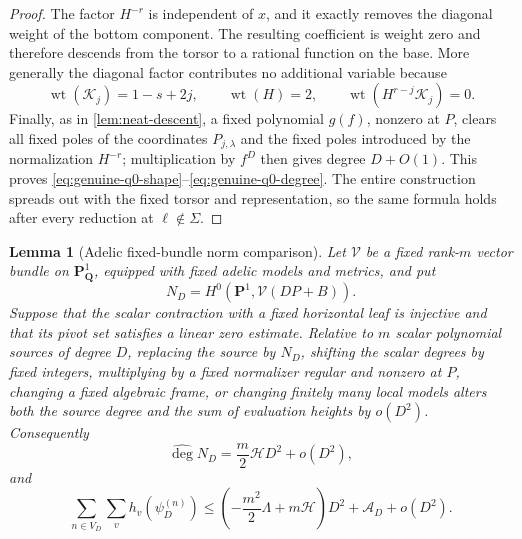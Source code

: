 \documentclass[11pt]{article}
\newtheorem{lemma}[lemma]{Lemma}
\theoremstyle{definition}
\theoremstyle{remark}
\newcommand{\Q}{\mathbf Q}
\newcommand{\calK}{\mathcal K}
\newcommand{\calV}{\mathcal V}
\newcommand{\widehatdeg}{\widehat{\deg}}
\newcommand{\Energy}{\mathscr H}
\newcommand{\LambdaAH}{\Lambda}
\begin{document}
\begin{proof}
The factor $H^{-r}$ is independent of $x$, and it exactly removes the
diagonal weight of the bottom component.  The resulting coefficient is
weight zero and therefore descends from the torsor to a rational function on
the base.  More generally the diagonal factor contributes no additional
variable because
\[
 \operatorname{wt}(\calK_j)=1-s+2j,
 \qquad \operatorname{wt}(H)=2,
 \qquad \operatorname{wt}(H^{r-j}\calK_j)=0.
\]
Finally, as in \cref{lem:neat-descent}, a fixed polynomial $g(f)$, nonzero at
$P$, clears all fixed poles of the coordinates $P_{j,\lambda}$ and the
fixed poles introduced by the normalization $H^{-r}$; multiplication by
$f^D$ then gives degree $D+O(1)$.  This proves
\eqref{eq:genuine-q0-shape}--\eqref{eq:genuine-q0-degree}.  The entire
construction spreads out with the fixed torsor and representation, so the
same formula holds after every reduction at $\ell\notin\Sigma$.
\end{proof}

\begin{lemma}[Adelic fixed-bundle norm comparison]
\label{lem:fixed-bundle}
Let $\calV$ be a fixed rank-$m$ vector bundle on $\mathbf P^1_\Q$, equipped
with fixed adelic models and metrics, and put
\[
 N_D=H^0\left(\mathbf P^1,\calV(DP+B)\right).
\]
Suppose that the scalar contraction with a fixed horizontal leaf is
injective and that its pivot set satisfies a linear zero estimate.  Relative
to $m$ scalar polynomial sources of degree $D$, replacing the source by
$N_D$, shifting the scalar degrees by fixed integers, multiplying by a fixed
normalizer regular and nonzero at $P$, changing a fixed algebraic frame, or
changing finitely many local models alters both the source degree and the
sum of evaluation heights by $o(D^2)$.  Consequently
\begin{equation}\label{eq:fixed-bundle-degree}
 \widehatdeg N_D=\frac m2\Energy D^2+o(D^2),
\end{equation}
and
\begin{equation}\label{eq:fixed-bundle-heights}
 \sum_{n\in V_D}\sum_vh_v(\psi_D^{(n)})
 \le\left(-\frac{m^2}{2}\LambdaAH+m\Energy\right)D^2
 +\mathscr A_D+o(D^2).
\end{equation}
\end{lemma}
\end{document}
